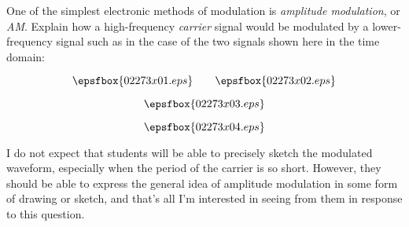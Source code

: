 

One of the simplest electronic methods of modulation is {\it amplitude modulation}, or {\it AM}.  Explain how a high-frequency {\it carrier} signal would be modulated by a lower-frequency signal such as in the case of the two signals shown here in the time domain:

$$\epsfbox{02273x01.eps} \hbox{\hskip 20pt} \epsfbox{02273x02.eps}$$

$$\epsfbox{02273x03.eps}$$







$$\epsfbox{02273x04.eps}$$







I do not expect that students will be able to precisely sketch the modulated waveform, especially when the period of the carrier is so short.  However, they should be able to express the general idea of amplitude modulation in some form of drawing or sketch, and that's all I'm interested in seeing from them in response to this question.




